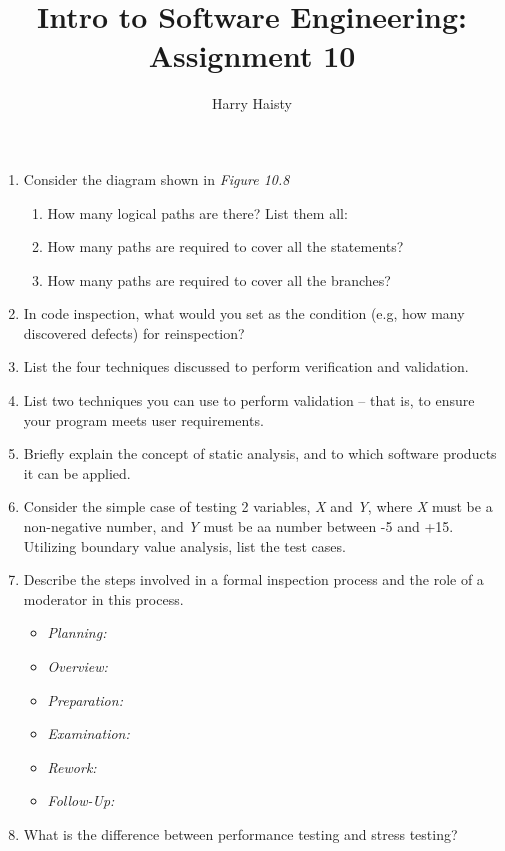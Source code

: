 \documentclass[11pt]{article}
\title{Intro to Software Engineering: Assignment 10}
\author{Harry Haisty}
\begin{document}
    \maketitle
    \begin{enumerate}
        \item Consider the diagram shown in \textit{Figure 10.8}
        \begin{enumerate}
        \item How many logical paths are there? List them all:
        
        \item How many paths are required to cover all the statements?
        
        \item How many paths are required to cover all the branches?
        \end{enumerate}
        
        \item In code inspection, what would you set as the condition (e.g, how many discovered defects) for reinspection?
        
        \item List the four techniques discussed to perform verification and validation.
        
        \item List two techniques you can use to perform validation -- that is, to ensure your program meets user requirements. 
        
        \item Briefly explain the concept of static analysis, and to which software products it can be applied.
        
        \item Consider the simple case of testing 2 variables, \textit{X} and \textit{Y}, where \textit{X} must be a non-negative number, and \textit{Y} must be aa number between -5 and +15. Utilizing boundary value analysis, list the test cases. 
        
        \item Describe the steps involved in a formal inspection process and the role of a moderator in this process.
        \begin{itemize}
        \item \textit{Planning: } 
        \item \textit{Overview: }
        \item \textit{Preparation: } 
        \item \textit{Examination: } 
        \item \textit{Rework: }
        \item \textit{Follow-Up: } 
        \end{itemize}
        
        \item What is the difference between performance testing and stress testing? 
        
        
    \end{enumerate}
    
    
\end{document}
